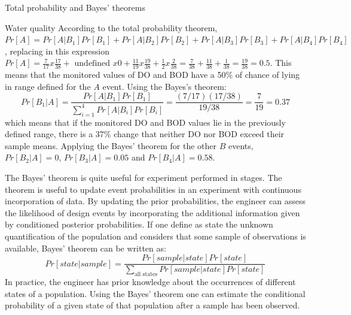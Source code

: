 \documentclass[8pt]{beamer}
\renewcommand{\emph}[1]{\textcolor{myorange}{#1}}
\begin{document}
\begin{frame}{Total probability and Bayes' theorems}
    \begin{exampleblock}{Water quality}
        According to the total probability theorem, $Pr[A] = Pr[A | B_1] Pr[B_1] + Pr[A | B_2] Pr[B_2] +Pr[A | B_3] Pr[B_3] +Pr[A | B_4] Pr[B_4]$, replacing in this expression $Pr[A] = \frac{7}{17} x \frac{17}{38} + \text{ undefined } x 0 + \frac{11}{19} x \frac{19}{38} + \frac{1}{2} x \frac{2}{38} = \frac{7}{38} + \frac{11}{38} + \frac{1}{38} = \frac{19}{38} = 0.5 $. This means that the monitored values of DO and BOD have a 50\% of chance of lying in range defined for the $A$ event. Using the Bayes's theorem:
        \vspace{-8pt}
        $$
        Pr[B_1 | A] = \frac{Pr[A | B_1] Pr[B_1]}{\sum_{i=1}^{4} Pr[A | B_i ] Pr[B_i]} = \frac{(7/17)(17/38)}{19/38} = \frac{7}{19} = 0.37
        $$
        which means that if the monitored DO and BOD values lie in the previously defined range, there is a 37\% change that neither DO nor BOD exceed their sample means. Applying the Bayes' theorem for the other $B$ events, $Pr[B_2 | A] = 0$, $Pr[B_3 | A] = 0.05$ and $Pr[B_4 | A] = 0.58$. 
    \end{exampleblock}
    The Bayes' theorem is quite useful for experiment performed in stages. The theorem is useful to update event probabilities in an experiment with continuous incorporation of data. By updating the prior probabilities, the engineer can assess the likelihood of design events by incorporating the additional information given by conditioned posterior probabilities. If one define as \emph{state} the unknown quantification of the \emph{population} and considers that some \emph{sample} of observations is available, Bayes' theorem can be written as:
    \vspace{-10pt}
    $$
    Pr[state | sample] = \frac{Pr[sample | state] Pr[state]}{\sum_{\text{all states}} Pr[sample | state] Pr[state] }
    $$
    In practice, the engineer has prior knowledge about the occurrences of different states of a population. Using the Bayes' theorem one can estimate the conditional probability of a given state of that population after a sample has been observed. 
\end{frame}

\end{document}
